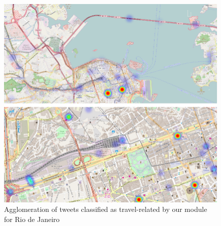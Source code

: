 \documentclass[9pt,a4paper]{extarticle}
\begin{document}
\begin{multicols}{2}
\begin{figure}[H]
	\centerline{\includegraphics[scale=.2]{rio_tweets_transportation.png}}
	\caption{Agglomeration of tweets classified as travel-related by our module for Rio de Janeiro}  
	\label{fig:rio_tweets_transportation}
\end{figure}





\end{multicols}
\end{document}
